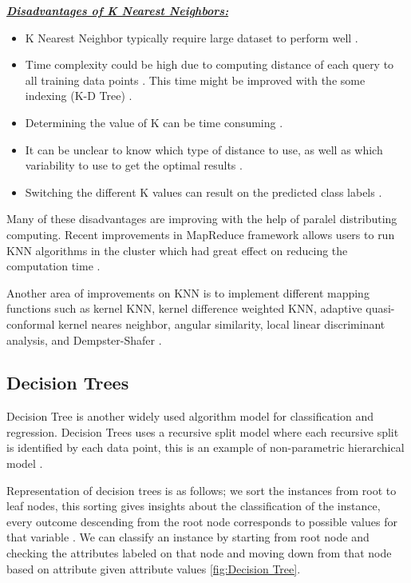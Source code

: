 \documentclass[sigconf]{acmart}
\begin{document}
\textbf{\underline{\textit{Disadvantages of K Nearest Neighbors:}}}

\begin{itemize}
\item K Nearest Neighbor typically require large dataset to perform well \cite{www-cs.man}. 
\item Time complexity could be high due to computing distance of each query to all training data points \cite{www-revoledu}. This time might be improved with the some indexing (K-D Tree) \cite{www-revoledu}.
\item Determining the value of K can be time consuming \cite{www-revoledu}. 
\item It can be unclear to know which type of distance to use, as well as which variability to use to get the optimal results \cite{www-revoledu}. 
\item Switching the different K values can result on the predicted class labels \cite{www-nickgillian}. 
\end{itemize}

Many of these disadvantages are improving with the help of paralel distributing computing. Recent improvements in MapReduce framework allows users to run KNN algorithms in the cluster which had great effect on reducing the computation time \cite{knn-chung}.

\par Another area of improvements on KNN is to implement different mapping functions such as kernel KNN, kernel difference weighted KNN, adaptive quasi-conformal kernel neares neighbor, angular similarity, local linear discriminant analysis, and Dempster-Shafer \cite{ERTUGRUL2017480}. 

\subsection{Decision Trees}
 
Decision Tree is another widely used algorithm model  for classification and regression. Decision Trees uses a recursive split model where each recursive split is identified by each data point, this is an example of non-parametric hierarchical model \cite{HASSAN201752}. 
\par Representation of decision trees is as follows; we sort the instances from root to leaf nodes, this sorting gives insights about the classification of the instance, every outcome descending from the root node corresponds to possible values for that variable \cite{www-cs.princeton}. We can classify an instance by starting from root node and checking the attributes labeled on that node and moving down from that node based on attribute given attribute values \cite{www-cs.princeton} \ref{fig:Decision Tree}. 
\end{document}
